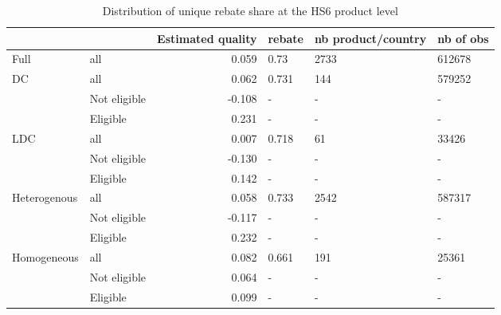 \documentclass[preview]{standalone}
\begin{document}
\begin{table}[!htbp] \centering
\caption{Distribution of unique rebate share at the HS6 product level}

\begin{adjustbox}{width=\textwidth, totalheight=\baselineskip,keepaspectratio}
\begin{tabular}{llrlll}
\toprule
            &          &  Estimated quality & rebate & nb product/country & nb of obs \\
\midrule
Full & all &              0.059 &   0.73 &               2733 &    612678 \\
DC & all &              0.062 &  0.731 &                144 &    579252 \\
            & Not eligible &             -0.108 &      - &                  - &         - \\
            & Eligible &              0.231 &      - &                  - &         - \\
LDC & all &              0.007 &  0.718 &                 61 &     33426 \\
            & Not eligible &             -0.130 &      - &                  - &         - \\
            & Eligible &              0.142 &      - &                  - &         - \\
Heterogenous & all &              0.058 &  0.733 &               2542 &    587317 \\
            & Not eligible &             -0.117 &      - &                  - &         - \\
            & Eligible &              0.232 &      - &                  - &         - \\
Homogeneous & all &              0.082 &  0.661 &                191 &     25361 \\
            & Not eligible &              0.064 &      - &                  - &         - \\
            & Eligible &              0.099 &      - &                  - &         - \\
\bottomrule
\end{tabular}

\end{adjustbox}

\begin{tablenotes}
\small
\item


\end{tablenotes}
\end{table}
\end{document}
